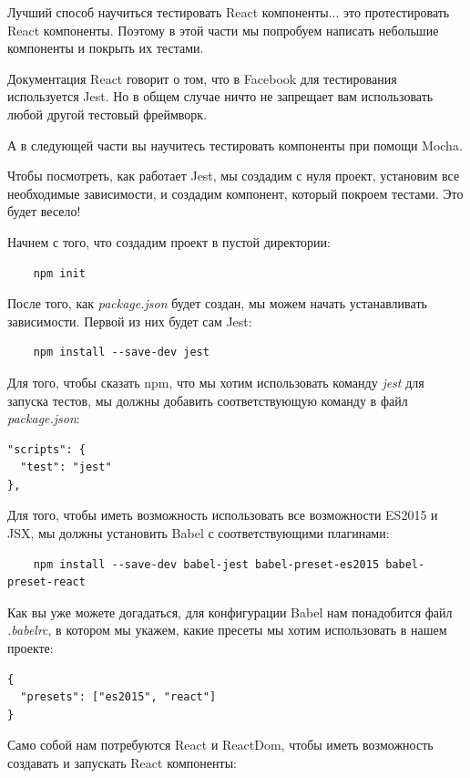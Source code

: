 Лучший способ научиться тестировать React компоненты... это протестировать React компоненты. Поэтому в этой части мы попробуем написать небольшие компоненты и покрыть их тестами. 

Документация React говорит о том, что в Facebook для тестирования используется Jest. Но в общем случае ничто не запрещает вам использовать любой другой тестовый фреймворк.

А в следующей части вы научитесь тестировать компоненты при помощи Mocha.

Чтобы посмотреть, как работает Jest, мы создадим с нуля проект, установим все необходимые зависимости, и создадим компонент, который покроем тестами. Это будет весело!

Начнем с того, что создадим проект в пустой директории:

\begin{lstlisting}
	npm init
\end{lstlisting}

После того, как \textit{package.json} будет создан, мы можем начать устанавливать зависимости. Первой из них будет сам Jest:

\begin{lstlisting}
	npm install --save-dev jest
\end{lstlisting}

Для того, чтобы сказать npm, что мы хотим использовать команду \textit{jest} для запуска тестов, мы должны добавить соответствующую команду в файл \textit{package.json}:

\begin{lstlisting}
"scripts": {
  "test": "jest"
},
\end{lstlisting}

Для того, чтобы иметь возможность использовать все возможности ES2015 и JSX, мы должны установить Babel с соответствующими плагинами:

\begin{lstlisting}
    npm install --save-dev babel-jest babel-preset-es2015 babel-preset-react
\end{lstlisting}

Как вы уже можете догадаться, для конфигурации Babel нам понадобится файл \textit{.babelrc}, в котором мы укажем, какие пресеты мы хотим использовать в нашем проекте:

\begin{lstlisting}
{
  "presets": ["es2015", "react"]
}
\end{lstlisting}

Само собой нам потребуются React и ReactDom, чтобы иметь возможность создавать и запускать React компоненты:

